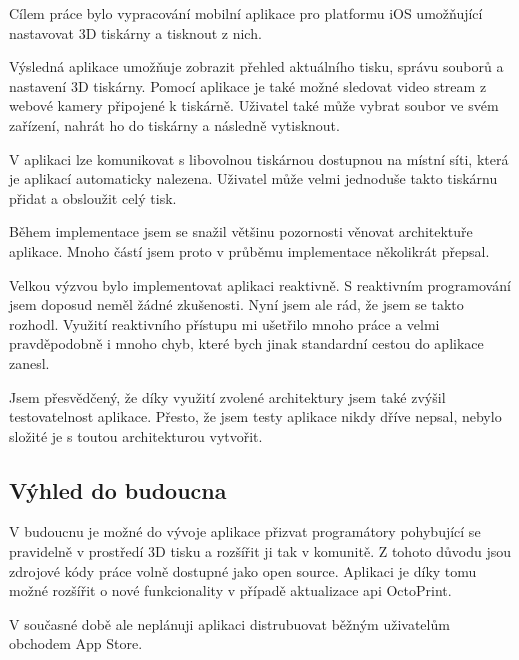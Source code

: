 Cílem práce bylo vypracování mobilní aplikace pro platformu iOS umožňující nastavovat 3D tiskárny a tisknout z nich.

Výsledná aplikace umožňuje zobrazit přehled aktuálního tisku, správu souborů a nastavení 3D tiskárny.
Pomocí aplikace je také možné sledovat video stream z webové kamery připojené k tiskárně.
Uživatel také může vybrat soubor ve svém zařízení, nahrát ho do tiskárny a následně vytisknout.

V aplikaci lze komunikovat s libovolnou tiskárnou dostupnou na místní síti, která je aplikací automaticky nalezena.
Uživatel může velmi jednoduše takto tiskárnu přidat a obsloužit celý tisk.

\bigskip

Během implementace jsem se snažil většinu pozornosti věnovat architektuře aplikace.
Mnoho částí jsem proto v průběmu implementace několikrát přepsal.

Velkou výzvou bylo implementovat aplikaci reaktivně.
S reaktivním programování jsem doposud neměl žádné zkušenosti.
Nyní jsem ale rád, že jsem se takto rozhodl.
Využití reaktivního přístupu mi ušetřilo mnoho práce a velmi pravděpodobně i mnoho chyb, které bych jinak standardní cestou do aplikace zanesl.

\bigskip

Jsem přesvědčený, že díky využití zvolené architektury jsem také zvýšil testovatelnost aplikace.
Přesto, že jsem testy aplikace nikdy dříve nepsal, nebylo složité je s toutou architekturou vytvořit.

\subsection*{Výhled do budoucna}

V budoucnu je možné do vývoje aplikace přizvat programátory pohybující se pravidelně v prostředí 3D tisku a rozšířit ji tak v komunitě.
Z tohoto důvodu jsou zdrojové kódy práce volně dostupné jako open source.
Aplikaci je díky tomu možné rozšířit o nové funkcionality v případě aktualizace \acrshort{api} OctoPrint.

V současné době ale neplánuji aplikaci distrubuovat běžným uživatelům obchodem App Store.
